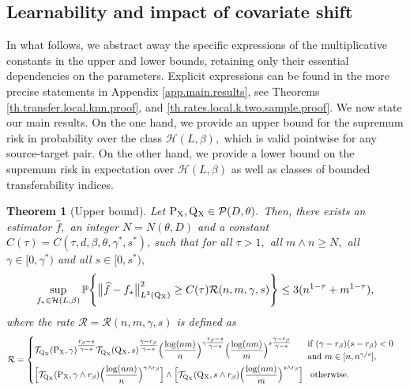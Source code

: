 \documentclass[10pt]{article}
\newcommand{\mH}{\mathcal{H}}
\newcommand{\mP}{\mathcal{P}}
\newcommand{\mR}{\mathcal{R}}
\newcommand{\mT}{\mathcal{T}}
\newcommand{\PP}{\mathbb{P}}
\renewcommand{\P}{\operatorname{P}}
\newcommand{\Q}{\operatorname{Q}}
\newcommand{\wh}{\widehat}
\newcommand{\sX}{\mathrm{X}}
\newtheorem{theorem}{Theorem}
\begin{document}
\subsection{Learnability and impact of covariate shift}
\label{sec.3.1}

In what follows, we abstract away the specific expressions of the multiplicative constants in the upper and lower bounds, retaining only their essential dependencies on the parameters. Explicit expressions can be found in the more precise statements in Appendix \ref{app.main.results}, see Theorems \ref{th.transfer.local.knn.proof}, and \ref{th.rates.local.k.two.sample.proof}. We now state our main results. On the one hand, we provide an upper bound for the supremum risk in probability over the class $\mH(L, \beta),$ which is valid pointwise for any source-target pair. On the other hand, we provide a lower bound on the supremum risk in expectation over $\mH(L, \beta)$ as well as classes of bounded transferability indices.
\begin{theorem}[Upper bound]
    \label{th.upper.bound.two.sample}
    Let $\P_{\sX}, \Q\mathstrut_{\!\sX} \in \mP(D, \theta).$ Then, there exists an estimator $\wh f,$ an integer $N = N(\theta, D)$ and a constant $C(\tau) = C(\tau, d, \beta, \theta, \gamma^*, s^*)$, such that for all $\tau > 1,$ all $m\wedge n \geq N,$ all $\gamma \in [0, \gamma^*)$ and all $s \in [0, s^*),$
    \begin{align*}
        \sup_{f_* \in \mH(L, \beta)}\PP\Bigg\{\big\|\wh f - f_*\big\|_{L^2(\Q\mathstrut_{\!\sX})}^2 \geq C(\tau)\mR(n, m, \gamma, s)\Bigg\} \leq 3(n^{1-\tau} + m^{1-\tau}),
    \end{align*}
    where the rate $\mR = \mR(n, m, \gamma, s)$ is defined as
    \begin{align*}
        \mR &= \begin{dcases}
            \mT_{\Q\mathstrut_{\!\sX}}(\P_{\sX}, \gamma)^{\tfrac{r_\beta - s}{\gamma - s}}\mT_{\Q\mathstrut_{\!\sX}}(\Q\mathstrut_{\!\sX}, s)^{\tfrac{\gamma - r_\beta}{\gamma - s}}\Big(\frac{\log(nm)}{n}\Big)^{\gamma \tfrac{r_\beta - s}{\gamma - s}}\Big(\frac{\log(nm)}{m}\Big)^{s\tfrac{\gamma - r_\beta}{\gamma - s}} &\!\!\! \vcenter{\hbox{\shortstack[l]{if $(\gamma-r_\beta)(s-r_\beta)<0$\\and $m\in[n,n^{\gamma/s}]$,}}}\\
            \Big[\mT_{\Q\mathstrut_{\!\sX}}(\P_{\sX}, \gamma \wedge r_\beta)\Big(\frac{\log(nm)}{n}\Big)^{\gamma \wedge r_\beta}\Big]\wedge \Big[\mT_{\Q\mathstrut_{\!\sX}}(\Q\mathstrut_{\!\sX}, s \wedge r_\beta)\Big(\frac{\log(nm)}{m}\Big)^{s\wedge r_\beta}\Big] &\!\!\!\text{ otherwise.}
        \end{dcases}
    \end{align*}
\end{theorem}
\end{document}
